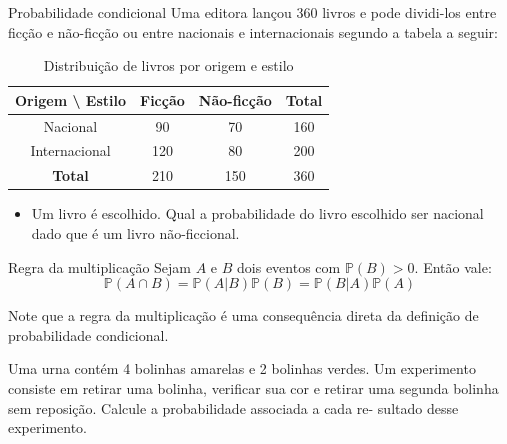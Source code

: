 \begin{frame}{Probabilidade condicional}
    Uma editora lançou 360 livros e pode dividi-los entre ficção e não-ficção ou entre nacionais e internacionais segundo a tabela a seguir:
    
    \begin{table}[H]
        \centering
        \begin{tabular}{|c|c|c|c|}
        \hline
        \textbf{Origem \textbackslash{} Estilo} & \textbf{Ficção} & \textbf{Não-ficção} & \textbf{Total} \\
        \hline
        Nacional     & 90  & 70  & 160 \\
        \hline
        Internacional & 120 & 80  & 200 \\
        \hline
        \textbf{Total}       & 210 & 150 & 360 \\
        \hline
        \end{tabular}
        \caption{Distribuição de livros por origem e estilo}
        \end{table}
        
        \pause

        \begin{itemize}
            \item Um livro é escolhido. Qual a probabilidade do livro escolhido ser nacional dado que é um livro não-ficcional. 
        \end{itemize}
\end{frame}

\begin{frame}{Regra da multiplicação}
 Sejam $A$ e $B$ dois eventos com $\mathds{P}(B)>0$. Então vale:
 $$\mathds{P}(A \cap B) = \mathds{P}(A | B) \mathds{P}(B) = \mathds{P}(B | A) \mathds{P}(A)$$

 \begin{atencao}
    Note que a regra da multiplicação é uma consequência direta da definição de probabilidade condicional. 
 \end{atencao}
\end{frame}

\begin{frame}
\begin{exemplo}
    Uma urna contém 4 bolinhas amarelas e 2 bolinhas verdes. Um
experimento consiste em retirar uma bolinha, verificar sua cor e retirar uma
segunda bolinha sem reposição. Calcule a probabilidade associada a cada re-
sultado desse experimento.
\end{exemplo}
\end{frame}

